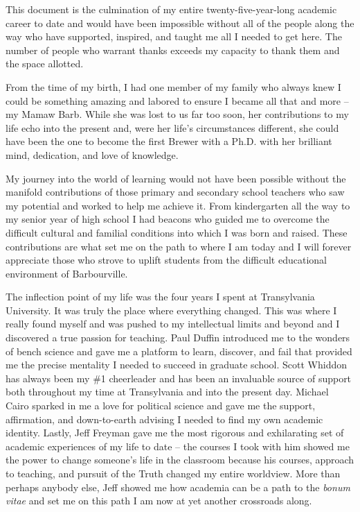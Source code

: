 \documentclass[PhD]{dukethesis2006}
\begin{document}
\begin{doublespace}

This document is the culmination of my entire twenty-five-year-long academic career to date and would have been impossible without all of the people along the way who have supported, inspired, and taught me all I needed to get here. The number of people who warrant thanks exceeds my capacity to thank them and the space allotted. 

From the time of my birth, I had one member of my family who always knew I could be something amazing and labored to ensure I became all that and more -- my Mamaw Barb. While she was lost to us far too soon, her contributions to my life echo into the present and, were her life's circumstances different, she could have been the one to become the first Brewer with a Ph.D. with her brilliant mind, dedication, and love of knowledge.

My journey into the world of learning would not have been possible without the manifold contributions of those primary and secondary school teachers who saw my potential and worked to help me achieve it. From kindergarten all the way to my senior year of high school I had beacons who guided me to overcome the difficult cultural and familial conditions into which I was born and raised. These contributions are what set me on the path to where I am today and I will forever appreciate those who strove to uplift students from the difficult educational environment of Barbourville.

The inflection point of my life was the four years I spent at Transylvania University. It was truly the place where everything changed. This was where I really found myself and was pushed to my intellectual limits and beyond and I discovered a true passion for teaching. Paul Duffin introduced me to the wonders of bench science and gave me a platform to learn, discover, and fail that provided me the precise mentality I needed to succeed in graduate school. Scott Whiddon has always been my \#1 cheerleader and has been an invaluable source of support both throughout my time at Transylvania and into the present day. Michael Cairo sparked in me a love for political science and gave me the support, affirmation, and down-to-earth advising I needed to find my own academic identity. Lastly, Jeff Freyman gave me the most rigorous and exhilarating set of academic experiences of my life to date -- the courses I took with him showed me the power to change someone's life in the classroom because his courses, approach to teaching, and pursuit of the Truth changed my entire worldview. More than perhaps anybody else, Jeff showed me how academia can be a path to the \textit{bonum vitae} and set me on this path I am now at yet another crossroads along.


\end{doublespace}
\end{document}
